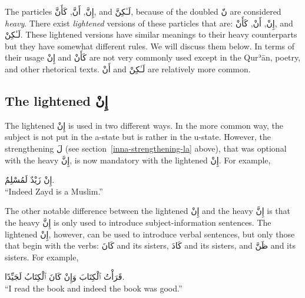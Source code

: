 \documentclass[
  10pt,
]{book}
\begin{document}
The particles \foreignlanguage{arabic}{إِنَّ}, \foreignlanguage{arabic}{أَنَّ}, \foreignlanguage{arabic}{کَأَنَّ}, and \foreignlanguage{arabic}{لَـٰکِنَّ}, because of the doubled \foreignlanguage{arabic}{نّ} are considered \emph{heavy}.
There exist \emph{lightened} versions of these particles that are:
\foreignlanguage{arabic}{إِنْ}, \foreignlanguage{arabic}{أَنْ}, \foreignlanguage{arabic}{کَأَنْ}, and \foreignlanguage{arabic}{لَـٰکِنْ}.
These lightened versions have similar meanings to their heavy counterparts but they have somewhat different rules. We will discuss them below.
In terms of their usage
\foreignlanguage{arabic}{إِنْ} and
\foreignlanguage{arabic}{کَأَنْ} are not very commonly used except in the Qurʾān, poetry, and other rhetorical texts.
\foreignlanguage{arabic}{أَنْ} and
\foreignlanguage{arabic}{لَـٰکِنْ}
are relatively more common.

\subsection{\texorpdfstring{The lightened \foreignlanguage{arabic}{إِنْ}}{The lightened إِنْ}}\label{the-lightened-ux625ux646}

The lightened
\foreignlanguage{arabic}{إِنْ}
is used in two different ways.
In the more common way, the subject is not put in the a-state but is rather in the u-state.
However, the strengthening \foreignlanguage{arabic}{لَ} (see section~\ref{inna-strengthening-la} above), that was optional with the heavy \foreignlanguage{arabic}{إِنَّ}, is now mandatory with the lightened \foreignlanguage{arabic}{إِنْ}. For example,

\foreignlanguage{arabic}{إِنْ زَيْدٌ لَمُسْلِمٌ.}\\
\enquote{Indeed Zayd is a Muslim.}

The other notable difference between
the lightened \foreignlanguage{arabic}{إِنْ}
and
the heavy \foreignlanguage{arabic}{إِنَّ}
is that
the heavy \foreignlanguage{arabic}{إِنَّ} is only used to introduce subject-information sentences.
The lightened \foreignlanguage{arabic}{إِنْ},
however, can be used to introduce verbal sentences, but only those that begin with the verbs:
\foreignlanguage{arabic}{کَانَ} and its sisters,
\foreignlanguage{arabic}{کَادَ} and its sisters, and
\foreignlanguage{arabic}{ظَنَّ} and its sisters.
For example,

\foreignlanguage{arabic}{قَرَأْتُ ٱلْکِتَابَ وَإِنْ کَانَ ٱلْکِتَابُ لَجَيِّدًا.}\\
\enquote{I read the book and indeed the book was good.}
\end{document}
